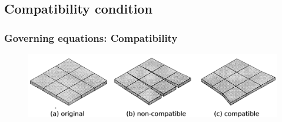 \documentclass[notes]{beamer}
\begin{document}
\subsection{Compatibility condition}
\begin{frame}
\frametitle{Governing equations: Compatibility}
 	\begin{figure}
	\includegraphics[width=\linewidth]{figs/compatibility.png}
\end{figure}
\end{frame}
\end{document}

